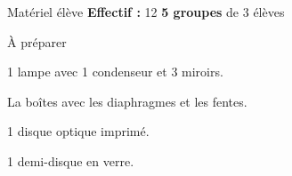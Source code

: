 
\begin{boiteMateriel}{Matériel élève}
  \textbf{Effectif :} 12
  \qq{}\qq{}
  \flecheLongue \textbf{5 groupes} de 3 élèves
\end{boiteMateriel}


\begin{boiteMateriel}{À préparer}
  \begin{protocole}
    \item 1 lampe avec 1 condenseur et 3 miroirs.
    \item La boîtes avec les diaphragmes et les fentes.
    \item 1 disque optique imprimé.
    \item 1 demi-disque en verre.
  \end{protocole}
\end{boiteMateriel}